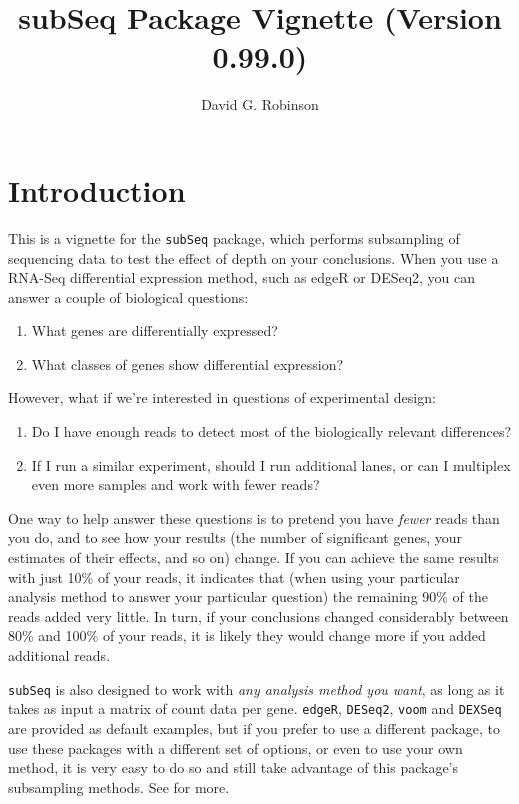 \documentclass{article}\usepackage[]{graphicx}\usepackage[]{color}
\begin{document}
\title{subSeq Package Vignette (Version 0.99.0)}
\author{David G. Robinson}
\maketitle

\tableofcontents

\section{Introduction}

This is a vignette for the \texttt{subSeq} package, which performs subsampling of sequencing data to test the effect of depth on your conclusions. When you use a RNA-Seq differential expression method, such as edgeR or DESeq2, you can answer a couple of biological questions:

\begin{enumerate}
\item What genes are differentially expressed?
\item What classes of genes show differential expression?
\end{enumerate}

However, what if we're interested in questions of experimental design:

\begin{enumerate}
\item Do I have enough reads to detect most of the biologically relevant differences?
\item If I run a similar experiment, should I run additional lanes, or can I multiplex even more samples and work with fewer reads? 
\end{enumerate}

One way to help answer these questions is to pretend you have \emph{fewer} reads than you do, and to see how your results (the number of significant genes, your estimates of their effects, and so on) change. If you can achieve the same results with just 10\% of your reads, it indicates that (when using your particular analysis method to answer your particular question) the remaining 90\% of the reads added very little. In turn, if your conclusions changed considerably between 80\% and 100\% of your reads, it is likely they would change more if you added additional reads.

\texttt{subSeq} is also designed to work with \emph{any analysis method you want}, as long as it takes as input a matrix of count data per gene. \texttt{edgeR}, \texttt{DESeq2}, \texttt{voom} and \texttt{DEXSeq} are provided as default examples, but if you prefer to use a different package, to use these packages with a different set of options, or even to use your own method, it is very easy to do so and still take advantage of this package's subsampling methods. See  for more.
\end{document}
